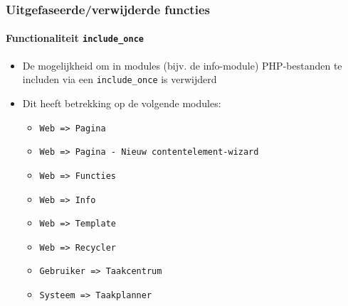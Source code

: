 
\begin{frame}[fragile]
	\frametitle{Uitgefaseerde/verwijderde functies}
	\framesubtitle{Functionaliteit \texttt{include\_once}}

	\begin{itemize}

		\item De mogelijkheid om in modules (bijv. de info-module) PHP-bestanden
			 te includen via een \texttt{include\_once} is verwijderd

		\item Dit heeft betrekking op de volgende modules:

			\begin{itemize}
				\item \texttt{Web => Pagina}
				\item \texttt{Web => Pagina - Nieuw contentelement-wizard}
				\item \texttt{Web => Functies}
				\item \texttt{Web => Info}
				\item \texttt{Web => Template}
				\item \texttt{Web => Recycler}
				\item \texttt{Gebruiker => Taakcentrum}
				\item \texttt{Systeem => Taakplanner}
			\end{itemize}

	\end{itemize}

\end{frame}


